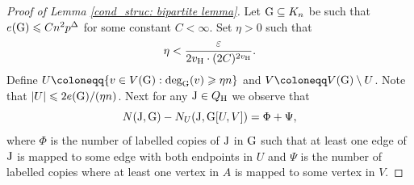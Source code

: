 \documentclass[a4paper,11pt,english,reqno]{amsart}
\numberwithin{equation}{section}
\renewcommand{\leq}{\leqslant}
\renewcommand{\geq}{\geqslant}
\newcommand{\uH}{\textup{H}}
\newcommand{\tu}[1]{\textup{#1}}
\begin{document}
			\begin{proof}[Proof of Lemma \ref{cond_struc: bipartite lemma}]
				Let $\tu{G}\subseteq K_{n}$ be such that $e(\tu{G})\leq C n^{2}p^{\Delta}$ for some constant $C< \infty$. Set $\eta>0$ such that
				\begin{equation}
					\label{eta:defn}
					\eta < \frac{\varepsilon}{2v_{\uH}\cdot (2C)^{2v_{\uH}}}.
				\end{equation}
				Define $U\coloneqq \{v\in V(\tu{G}): \tu{deg}_{\tu{G}}(v)\geq \eta n\}$ and $V\coloneqq V(\tu{G})\setminus U$. Note that $|U| \leq 2e(\tu{G})/(\eta n)$.
				Next for any $\tu{J}\in Q_{\uH}$ we %
				observe that
				\begin{equation}\label{eq:Psi-Phi}
					N(\tu{J}, \tu{G}) - N_{U}(\tu{J}, \tu{G}[U,V]) = \Phi + \Psi,
				\end{equation}
				where $\Phi$ is the number of labelled copies of $\tu{J}$ in $\tu{G}$ such that at least one edge of $\tu{J}$ is mapped to some edge with both endpoints in $U$ and $\Psi$ is the number of labelled copies where at least one vertex in $A$ is mapped to some vertex in $V$. 
				

\end{proof}
\end{document}

